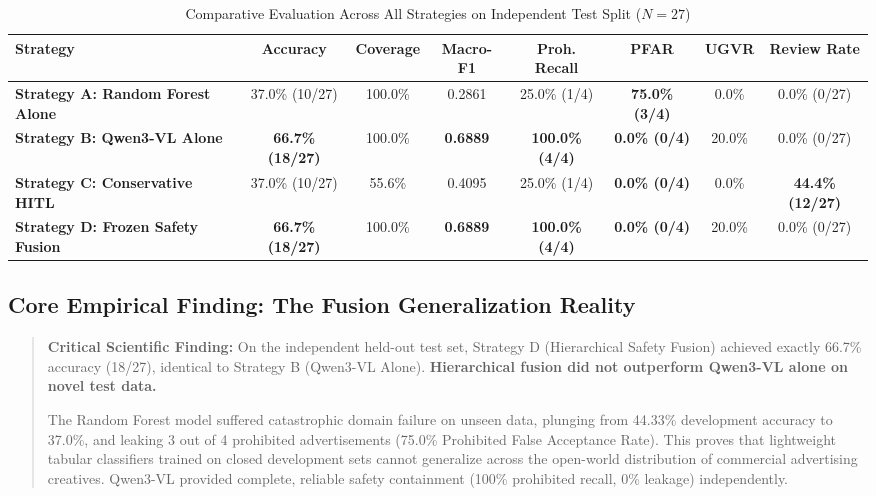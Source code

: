 \documentclass[12pt,a4paper]{report}
\begin{document}
\begin{table}[htbp]
\centering
\small
\caption{Comparative Evaluation Across All Strategies on Independent Test Split ($N=27$)}
\label{tab:p10d_main}
\setlength{\tabcolsep}{2.5pt}
\renewcommand{\arraystretch}{1.2}
\begin{tabular}{|l|c|c|c|c|c|c|c|}
\hline
\textbf{Strategy} & \textbf{Accuracy} & \textbf{Coverage} & \textbf{Macro-F1} & \textbf{Proh. Recall} & \textbf{PFAR} & \textbf{UGVR} & \textbf{Review Rate} \\
\hline
\textbf{Strategy A: Random Forest Alone} & 37.0\% (10/27) & 100.0\% & 0.2861 & 25.0\% (1/4) & \textbf{75.0\% (3/4)} & 0.0\% & 0.0\% (0/27) \\
\textbf{Strategy B: Qwen3-VL Alone} & \textbf{66.7\% (18/27)} & 100.0\% & \textbf{0.6889} & \textbf{100.0\% (4/4)} & \textbf{0.0\% (0/4)} & 20.0\% & 0.0\% (0/27) \\
\textbf{Strategy C: Conservative HITL} & 37.0\% (10/27) & 55.6\% & 0.4095 & 25.0\% (1/4) & \textbf{0.0\% (0/4)} & 0.0\% & \textbf{44.4\% (12/27)} \\
\textbf{Strategy D: Frozen Safety Fusion} & \textbf{66.7\% (18/27)} & 100.0\% & \textbf{0.6889} & \textbf{100.0\% (4/4)} & \textbf{0.0\% (0/4)} & 20.0\% & 0.0\% (0/27) \\
\hline
\end{tabular}
\end{table}

\subsection{Core Empirical Finding: The Fusion Generalization Reality}
\begin{quote}
\textbf{Critical Scientific Finding:} On the independent held-out test set, Strategy D (Hierarchical Safety Fusion) achieved exactly 66.7\% accuracy (18/27), identical to Strategy B (Qwen3-VL Alone). \textbf{Hierarchical fusion did not outperform Qwen3-VL alone on novel test data.}

The Random Forest model suffered catastrophic domain failure on unseen data, plunging from 44.33\% development accuracy to 37.0\%, and leaking 3 out of 4 prohibited advertisements (75.0\% Prohibited False Acceptance Rate). This proves that lightweight tabular classifiers trained on closed development sets cannot generalize across the open-world distribution of commercial advertising creatives. Qwen3-VL provided complete, reliable safety containment (100\% prohibited recall, 0\% leakage) independently.
\end{quote}
\end{document}
